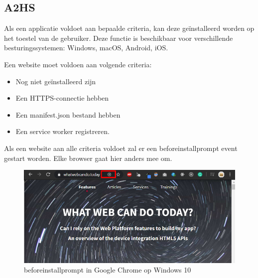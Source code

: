\subsection{A2HS}

	
	Als een applicatie voldoet aan bepaalde criteria, kan deze geïnstalleerd worden op het toestel van de gebruiker. Deze functie is beschikbaar voor verschillende besturingssystemen: Windows, macOS, Android, iOS.
	
	Een website moet voldoen aan volgende criteria:
	
	\begin{itemize}
		\item	Nog niet geïnstalleerd zijn
		\item	Een HTTPS-connectie hebben
		\item	Een manifest.json bestand hebben
		\item	Een service worker registreren.
	\end{itemize}
	
	Als een website aan alle criteria voldoet zal er een beforeinstallprompt event gestart worden. Elke browser gaat hier anders mee om. 
	
	\begin{figure}[H]
		\centering
		\includegraphics{./img/beforeinstallprompt_windows.png}	
		\caption{beforeinstallprompt in Google Chrome op Windows 10}
	\end{figure}
	
